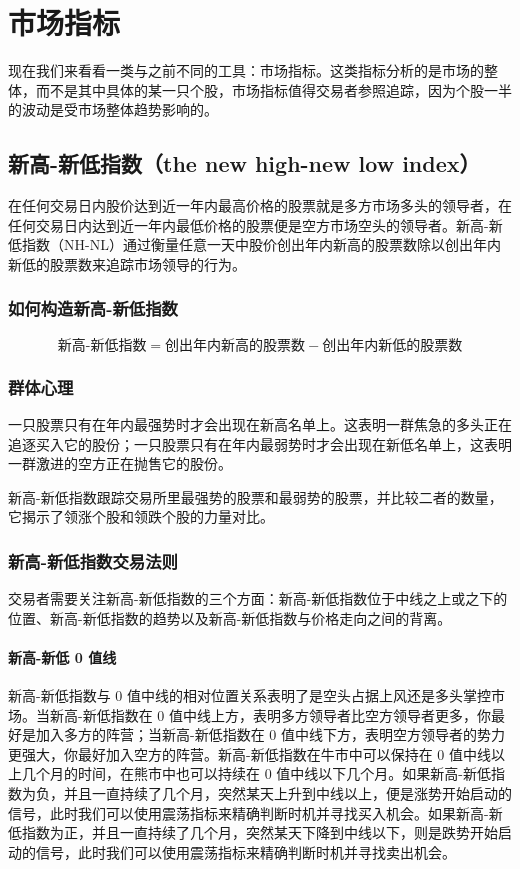\chapter{市场指标}
现在我们来看看一类与之前不同的工具：市场指标。这类指标分析的是市场的整体，而不是其中具体的某一只个股，市场指标值得交易者参照追踪，因为个股一半的波动是受市场整体趋势影响的。
\section{新高-新低指数（the new high-new low index）}
在任何交易日内股价达到近一年内最高价格的股票就是多方市场多头的领导者，在任何交易日内达到近一年内最低价格的股票便是空方市场空头的领导者。新高-新低指数（NH-NL）通过衡量任意一天中股价创出年内新高的股票数除以创出年内新低的股票数来追踪市场领导的行为。
\subsection*{如何构造新高-新低指数}
\begin{equation}
    \text{新高-新低指数}=\text{创出年内新高的股票数}-\text{创出年内新低的股票数}
\end{equation}
\subsection*{群体心理}
一只股票只有在年内最强势时才会出现在新高名单上。这表明一群焦急的多头正在追逐买入它的股份；一只股票只有在年内最弱势时才会出现在新低名单上，这表明一群激进的空方正在抛售它的股份。

新高-新低指数跟踪交易所里最强势的股票和最弱势的股票，并比较二者的数量，它揭示了领涨个股和领跌个股的力量对比。
\subsection*{新高-新低指数交易法则}
交易者需要关注新高-新低指数的三个方面：新高-新低指数位于中线之上或之下的位置、新高-新低指数的趋势以及新高-新低指数与价格走向之间的背离。
\subsubsection*{新高-新低 0 值线}
新高-新低指数与 0 值中线的相对位置关系表明了是空头占据上风还是多头掌控市场。当新高-新低指数在 0 值中线上方，表明多方领导者比空方领导者更多，你最好是加入多方的阵营；当新高-新低指数在 0 值中线下方，表明空方领导者的势力更强大，你最好加入空方的阵营。新高-新低指数在牛市中可以保持在 0 值中线以上几个月的时间，在熊市中也可以持续在 0 值中线以下几个月。如果新高-新低指数为负，并且一直持续了几个月，突然某天上升到中线以上，便是涨势开始启动的信号，此时我们可以使用震荡指标来精确判断时机并寻找买入机会。如果新高-新低指数为正，并且一直持续了几个月，突然某天下降到中线以下，则是跌势开始启动的信号，此时我们可以使用震荡指标来精确判断时机并寻找卖出机会。
